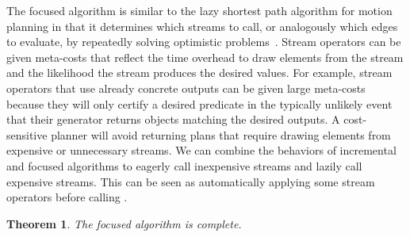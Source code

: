 \documentclass[letterpaper]{article} %
\theoremstyle{plain}\newtheorem{thm}{Theorem}
\theoremstyle{definition}\newtheorem{defn}{Definition}
\theoremstyle{plain}\newtheorem{lem}{Lemma}
\theoremstyle{plain}\newtheorem{cor}{Corollary}
\newcommand{\eager}{incremental}
\newcommand{\focused}{focused}
\begin{document}
The \focused{} algorithm is similar to the lazy shortest path
algorithm for motion planning in that it determines which streams to call, or 
analogously which edges to evaluate, by repeatedly solving optimistic problems~\cite{bohlin2000path,dellin2016unifying}.
Stream operators can be given meta-costs that reflect the time overhead to 
draw elements from the stream and the likelihood the stream produces the desired values. 
For example, stream operators that use already concrete outputs can be given large meta-costs because they will only certify a desired predicate in the typically unlikely event that their generator returns objects matching the desired outputs.
A cost-sensitive planner will avoid returning
plans that require drawing elements from expensive or unnecessary streams. 
We can combine the behaviors of \eager{} and \focused{} algorithms to
eagerly call inexpensive streams and lazily call expensive streams. This can 
be seen as automatically applying some stream operators before calling .


\begin{thm}
The \focused{} algorithm is complete.
\end{thm}



\end{document}

